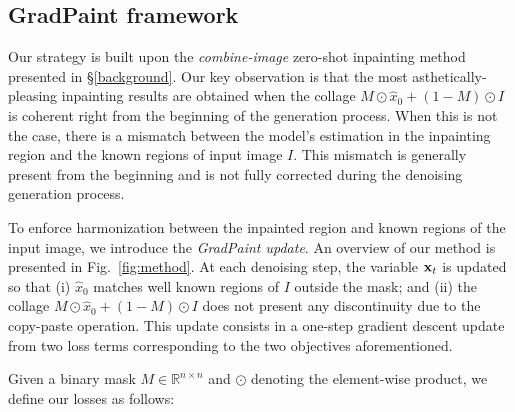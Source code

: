 \subsection{GradPaint framework}





Our strategy is built upon the \textit{combine-image} zero-shot inpainting method presented in \S\ref{background}. Our key observation is that the most asthetically-pleasing inpainting results are obtained when the collage $M \odot \hat{x}_0 + (1-M) \odot I$ is coherent right from the beginning of the generation process. When this is not the case, there is a mismatch between the model's estimation in the inpainting region and the known regions of input image $I$. This mismatch is generally present from the beginning and is not fully corrected during the denoising generation process. 

To enforce harmonization between the inpainted region and known regions of the input image, we introduce the \textit{GradPaint update}. An overview of our method is presented in Fig.~\ref{fig:method}.
At each denoising step, the variable $\mathbf{x}_t$ is updated so that (i) $\hat{x}_0$ matches well known regions of $I$ outside the mask; and (ii) the collage $M \odot \hat{x}_0 + (1-M) \odot I$ does not present any discontinuity due to the copy-paste operation. This update consists in a one-step gradient descent update from two loss terms corresponding to the two objectives aforementioned. %




Given a binary mask $M \in \mathbb{R}^{n \times n}$ and $\odot$ denoting the element-wise product, we define our losses as follows:

